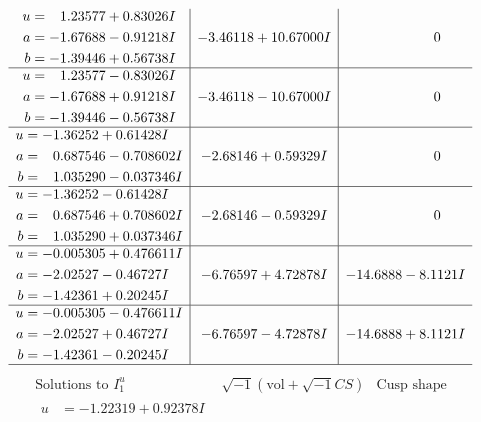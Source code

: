 \documentclass[1p]{elsarticle_modified}
\theoremstyle{definition}
\newcommand{\I}{\sqrt{-1}}
\begin{document}
$$\begin{array}{c|c|c}
\begin{aligned}
u &= \phantom{-}1.23577 + 0.83026 I \\
a &= -1.67688 - 0.91218 I \\
b &= -1.39446 + 0.56738 I\end{aligned}
 & -3.46118 + 10.67000 I & \phantom{-0.000000 } 0 \\ \hline\begin{aligned}
u &= \phantom{-}1.23577 - 0.83026 I \\
a &= -1.67688 + 0.91218 I \\
b &= -1.39446 - 0.56738 I\end{aligned}
 & -3.46118 - 10.67000 I & \phantom{-0.000000 } 0 \\ \hline\begin{aligned}
u &= -1.36252 + 0.61428 I \\
a &= \phantom{-}0.687546 - 0.708602 I \\
b &= \phantom{-}1.035290 - 0.037346 I\end{aligned}
 & -2.68146 + 0.59329 I & \phantom{-0.000000 } 0 \\ \hline\begin{aligned}
u &= -1.36252 - 0.61428 I \\
a &= \phantom{-}0.687546 + 0.708602 I \\
b &= \phantom{-}1.035290 + 0.037346 I\end{aligned}
 & -2.68146 - 0.59329 I & \phantom{-0.000000 } 0 \\ \hline\begin{aligned}
u &= -0.005305 + 0.476611 I \\
a &= -2.02527 - 0.46727 I \\
b &= -1.42361 + 0.20245 I\end{aligned}
 & -6.76597 + 4.72878 I & -14.6888 - 8.1121 I \\ \hline\begin{aligned}
u &= -0.005305 - 0.476611 I \\
a &= -2.02527 + 0.46727 I \\
b &= -1.42361 - 0.20245 I\end{aligned}
 & -6.76597 - 4.72878 I & -14.6888 + 8.1121 I\\
 \hline 
 \end{array}$$\newpage$$\begin{array}{c|c|c}  
\text{Solutions to }I^u_{1}& \I (\text{vol} + \sqrt{-1}CS) & \text{Cusp shape}\\
 \hline 
\begin{aligned}
u &= -1.22319 + 0.92378 I \\

\end{aligned}
\end{array}$$
\end{document}
